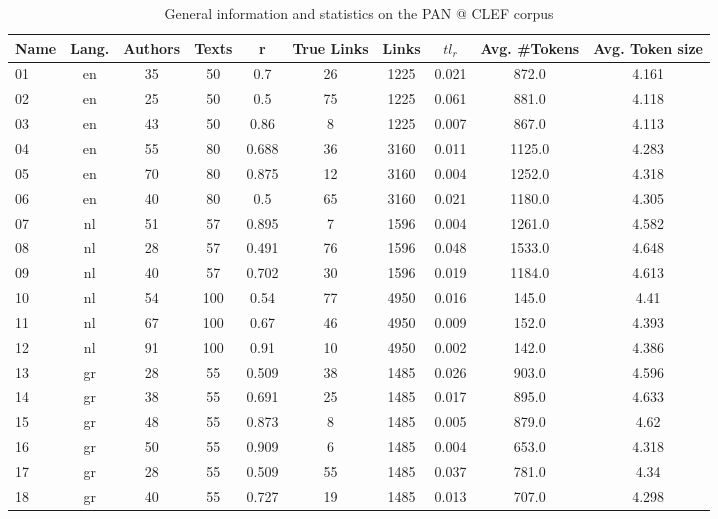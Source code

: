 \begin{table}[H]
  \caption{General information and statistics on the PAN @ CLEF corpus}
  \label{tab:pan_corpus}

  \begin{tabular}{l c c c c c c c c c}
    \toprule
    \textbf{Name} &
    \textbf{Lang.} &
    \textbf{Authors} &
    \textbf{Texts} &
    \textbf{r} &
    \textbf{True Links} &
    \textbf{Links} &
    \textbf{$tl_r$} &
    \textbf{Avg. \#Tokens} &
    \textbf{Avg. Token size} \\
    \midrule
      01 & en & 35 & 50 & 0.7 & 26 & 1225 & 0.021 & 872.0 & 4.161 \\
      02 & en & 25 & 50 & 0.5 & 75 & 1225 & 0.061 & 881.0 & 4.118 \\
      03 & en & 43 & 50 & 0.86 & 8 & 1225 & 0.007 & 867.0 & 4.113 \\
      04 & en & 55 & 80 & 0.688 & 36 & 3160 & 0.011 & 1125.0 & 4.283 \\
      05 & en & 70 & 80 & 0.875 & 12 & 3160 & 0.004 & 1252.0 & 4.318 \\
      06 & en & 40 & 80 & 0.5 & 65 & 3160 & 0.021 & 1180.0 & 4.305 \\
      07 & nl & 51 & 57 & 0.895 & 7 & 1596 & 0.004 & 1261.0 & 4.582 \\
      08 & nl & 28 & 57 & 0.491 & 76 & 1596 & 0.048 & 1533.0 & 4.648 \\
      09 & nl & 40 & 57 & 0.702 & 30 & 1596 & 0.019 & 1184.0 & 4.613 \\
      10 & nl & 54 & 100 & 0.54 & 77 & 4950 & 0.016 & 145.0 & 4.41 \\
      11 & nl & 67 & 100 & 0.67 & 46 & 4950 & 0.009 & 152.0 & 4.393 \\
      12 & nl & 91 & 100 & 0.91 & 10 & 4950 & 0.002 & 142.0 & 4.386 \\
      13 & gr & 28 & 55 & 0.509 & 38 & 1485 & 0.026 & 903.0 & 4.596 \\
      14 & gr & 38 & 55 & 0.691 & 25 & 1485 & 0.017 & 895.0 & 4.633 \\
      15 & gr & 48 & 55 & 0.873 & 8 & 1485 & 0.005 & 879.0 & 4.62 \\
      16 & gr & 50 & 55 & 0.909 & 6 & 1485 & 0.004 & 653.0 & 4.318 \\
      17 & gr & 28 & 55 & 0.509 & 55 & 1485 & 0.037 & 781.0 & 4.34 \\
      18 & gr & 40 & 55 & 0.727 & 19 & 1485 & 0.013 & 707.0 & 4.298 \\
    \bottomrule
  \end{tabular}


\end{table}

